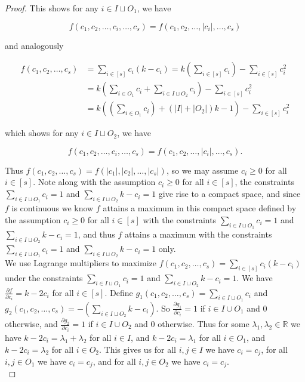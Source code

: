 \documentclass{article}
\begin{document}
\begin{proof}
\noindent
This shows for any $i \in I \sqcup O_1$, we have 

$$f(c_1,c_2, \ldots, c_i, \ldots, c_s) = f(c_1,c_2, \ldots, |c_i|, \ldots, c_s)$$

\noindent
and analogously 

\begin{align*}
f(c_1,c_2,\ldots,c_{s}) &= \sum_{i \in [s]} c_i(k-c_i) = k \left( \sum_{i \in [s]} c_i \right) - \sum_{i \in [s]} c_i^2 \\
&= k \left( \sum_{i \in O_1} c_i + \sum_{i \in I \sqcup O_2} c_i \right) - \sum_{i \in [s]} c_i^2 \\
&= k \left( \left( \sum_{i \in O_1} c_i \right) +  (|I| + |O_2|)k-1  \right) - \sum_{i \in [s]} c_i^2
\end{align*}

\noindent 
which shows for any $i \in I \sqcup O_2$, we have 

$$f(c_1,c_2, \ldots, c_i, \ldots, c_s) = f(c_1,c_2, \ldots, |c_i|, \ldots, c_s).$$ 

\noindent
Thus $f(c_1,c_2,\ldots,c_s) = f(|c_1|,|c_2|,\ldots,|c_s|)$, so we may assume $c_i \geq 0$ for all $i \in [s]$. Note along with the assumption $c_i \geq 0$ for all $i \in [s]$, the constraints $\sum_{i \in I \sqcup O_1} c_i = 1$ and $\sum_{i \in I \sqcup O_2 } k-c_i = 1$ give rise to a compact space, and since $f$ is continuous we know $f$ attains a maximum in this compact space defined by the assumption $c_i \geq 0$ for all $i \in [s]$ with the constraints $\sum_{i \in I \sqcup O_1} c_i = 1$ and $\sum_{i \in I \sqcup O_2 } k-c_i = 1$, and thus $f$ attains a maximum with the constraints $\sum_{i \in I \sqcup O_1} c_i = 1$ and $\sum_{i \in I \sqcup O_2 } k-c_i = 1$ only. \\

We use Lagrange multipliers to maximize $f(c_1,c_2,\ldots,c_{s}) = \sum_{i \in [s]} c_i(k-c_i)$ under the constraints $\sum_{i \in I \sqcup O_1} c_i = 1$ and $\sum_{i \in I \sqcup O_2 } k-c_i = 1$. We have $\frac{\partial f}{\partial c_i} = k - 2c_i$ for all $i \in [s]$. Define $g_1(c_1,c_2,\ldots,c_s) = \sum_{i \in I \sqcup O_1} c_i$ and $g_2(c_1,c_2,\ldots,c_s) = -(\sum_{i \in I \sqcup O_2 } k-c_i)$. So $\frac{\partial g_1}{\partial c_i} = 1$ if $i \in I \cup O_1$ and $0$ otherwise, and $\frac{\partial g_2}{\partial c_i} = 1$ if $i \in I \cup O_2$ and $0$ otherwise. Thus for some $\lambda_1,\lambda_2 \in \mathbb{R}$ we have 
$k-2c_i = \lambda_1+\lambda_2$ for all $i \in I$, and $k-2c_i = \lambda_1$ for all $i \in O_1$, and $k-2c_i = \lambda_2$ for all $i \in O_2$. This gives us for all $i,j \in I$ we have $c_i = c_j$, for all $i,j \in O_1$ we have $c_i = c_j$, and for all $i,j \in O_2$ we have $c_i = c_j$. \\


\end{proof}
\end{document}
